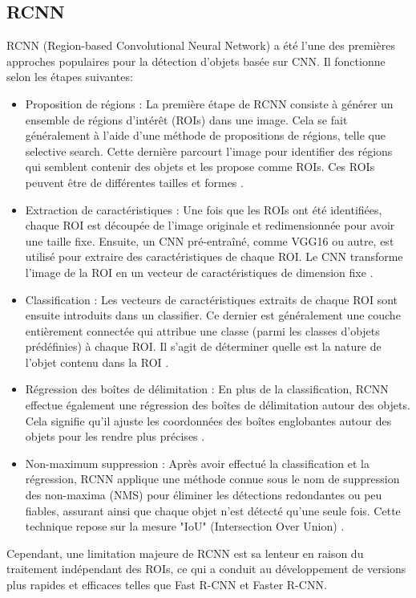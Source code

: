 \subsection{RCNN}
RCNN (Region-based Convolutional Neural Network) a été l'une des premières approches populaires pour la détection d'objets basée sur CNN. Il fonctionne selon les étapes suivantes: 
\begin{itemize}
    \item Proposition de régions : La première étape de RCNN consiste à générer un ensemble de régions d'intérêt (ROIs) dans une image. Cela se fait généralement à l'aide d'une méthode de propositions de régions, telle que selective search. Cette dernière parcourt l'image pour identifier des régions qui semblent contenir des objets et les propose comme ROIs. Ces ROIs peuvent être de différentes tailles et formes \cite{ch2_The5Comp69}.
    \item Extraction de caractéristiques : Une fois que les ROIs ont été identifiées, chaque ROI est découpée de l'image originale et redimensionnée pour avoir une taille fixe. Ensuite, un CNN pré-entraîné, comme VGG16 ou autre, est utilisé pour extraire des caractéristiques de chaque ROI. Le CNN transforme l'image de la ROI en un vecteur de caractéristiques de dimension fixe \cite{ch2_The5Comp69}.
    \item Classification : Les vecteurs de caractéristiques extraits de chaque ROI sont ensuite introduits dans un classifier. Ce dernier est généralement une couche entièrement connectée qui attribue une classe (parmi les classes d'objets prédéfinies) à chaque ROI. Il s'agit de déterminer quelle est la nature de l'objet contenu dans la ROI \cite{ch2_The5Comp69}.
    \item Régression des boîtes de délimitation : En plus de la classification, RCNN effectue également une régression des boîtes de délimitation autour des objets. Cela signifie qu'il ajuste les coordonnées des boîtes englobantes autour des objets pour les rendre plus précises \cite{ch2_The5Comp69}.
    \item Non-maximum suppression : Après avoir effectué la classification et la régression, RCNN applique une méthode connue sous le nom de suppression des non-maxima (NMS) pour éliminer les détections redondantes ou peu fiables, assurant ainsi que chaque objet n'est détecté qu'une seule fois. Cette technique repose sur la mesure "IoU" (Intersection Over Union) \cite{ch2_The5Comp69}.
\end{itemize}
Cependant, une limitation majeure de RCNN est sa lenteur en raison du traitement indépendant des ROIs, ce qui a conduit au développement de versions plus rapides et efficaces telles que Fast R-CNN et Faster R-CNN.


